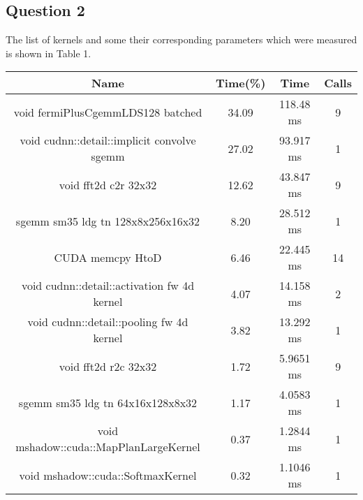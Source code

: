 \documentclass[12pt,titlepage]{article}
\begin{document}
\subsection*{Question 2}
The list of kernels and some their corresponding parameters which were measured is shown in Table 1.
\begin{table}[h!]
	\centering
	\begin{tabular}{||c | c | c | c||}
		\hline
		Name                                                                                                      & Time(\%) & Time          & Calls \\ [0.5ex]
		\hline\hline
		void fermiPlusCgemmLDS128  \textunderscore  batched                                                       & 34.09    & 118.48 ms     & 9     \\
		void cudnn::detail::implicit   \textunderscore   convolve  \textunderscore  sgemm                         & 27.02    & 93.917 ms     & 1     \\
		void fft2d  \textunderscore  c2r  \textunderscore  32x32                                                  & 12.62    & 43.847 ms     & 9     \\
		sgemm  \textunderscore  sm35  \textunderscore  ldg  \textunderscore  tn  \textunderscore  128x8x256x16x32 & 8.20     & 28.512 ms     & 1     \\
		CUDA  \textunderscore  memcpy  \textunderscore  HtoD                                                      & 6.46     & 22.445 ms     & 14    \\
		void cudnn::detail::activation  \textunderscore  fw  \textunderscore  4d  \textunderscore  kernel         & 4.07     & 14.158 ms     & 2     \\
		void cudnn::detail::pooling  \textunderscore  fw  \textunderscore  4d  \textunderscore  kernel            & 3.82     & 13.292 ms     & 1     \\
		void fft2d  \textunderscore  r2c  \textunderscore  32x32                                                  & 1.72     & 5.9651 ms     & 9     \\
		sgemm  \textunderscore  sm35  \textunderscore  ldg \textunderscore tn  \textunderscore  64x16x128x8x32    & 1.17     & 4.0583 ms     & 1     \\
		void mshadow::cuda::MapPlanLargeKernel                                                                    & 0.37     & 1.2844 ms     & 1     \\
		void mshadow::cuda::SoftmaxKernel                                                                         & 0.32     & 1.1046 ms     & 1     \\

\end{tabular}
\end{table}
\end{document}
